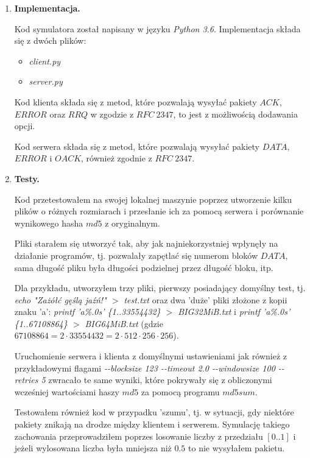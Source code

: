 \documentclass{report}
\begin{document}
\begin{enumerate}
\item \textbf{Implementacja.}

Kod symulatora został napisany w języku \textit{Python 3.6}. Implementacja składa się z  dwóch plików:
\begin{itemize}
\item \textit{client.py}
\item \textit{server.py}
\end{itemize}

Kod klienta składa się z metod, które pozwalają wysyłać pakiety $ACK$, $ERROR$ oraz $RRQ$ w zgodzie z $RFC\ 2347$, to jest z możliwością dodawania opcji.

Kod serwera składa się z metod, które pozwalają wysyłać pakiety $DATA$, $ERROR$ i $OACK$, również zgodnie z $RFC\ 2347$.

\item \textbf{Testy.}

Kod przetestowałem na swojej lokalnej maszynie poprzez utworzenie kilku plików o różnych rozmiarach i przesłanie ich za pomocą serwera i porównanie wynikowego hasha $md5$ z oryginalnym.

Pliki starałem się utworzyć tak, aby jak najniekorzystniej wpłynęły na działanie programów, tj. pozwalały zapętlać się numerom bloków $DATA$, sama długość pliku była długości podzielnej przez długość bloku, itp.

Dla przykładu, utworzyłem trzy pliki, pierwszy posiadający domyślny test, tj. \textit{echo "Zażółć gęślą jaźń!" $>$ test.txt} oraz dwa 'duże' pliki złożone z kopii znaku 'a': \textit{printf 'a\%.0s' \{1..33554432\} $>$ BIG32MiB.txt} i \textit{printf 'a\%.0s' \{1..67108864\} $>$ BIG64MiB.txt} (gdzie $67108864 = 2\cdot 33554432 = 2 \cdot 512 \cdot 256 \cdot 256$).

Uruchomienie serwera i klienta z domyślnymi ustawieniami jak również z przykładowymi flagami \textit{-{}-blocksize 123 -{}-timeout 2.0 -{}-windowsize 100 -{}-retries 5} zwracało te same wyniki, które pokrywały się z obliczonymi wcześniej wartościami haszy $md5$ za pomocą programu $md5sum$.

Testowałem również kod w przypadku 'szumu', tj. w sytuacji, gdy niektóre pakiety znikają na drodze między klientem i serwerem. Symulację takiego zachowania przeprowadziłem poprzes losowanie liczby z przedziału $[0..1]$ i jeżeli wylosowana liczba była mniejsza niż $0.5$ to nie wysyłałem pakietu.
\end{enumerate}
\end{document}
